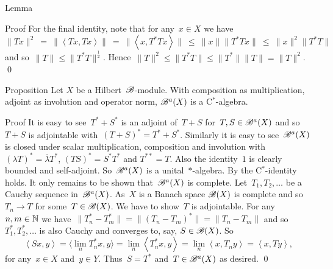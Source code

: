 \begin{parsec}
\begin{point}{Lemma}
\begin{point}{Proof}
For the final identity, note that for any~$x \in X$ we have
\begin{equation*}
\|Tx\|^2 \ =\  \|\left<Tx,Tx\right>\| 
            \ =\  \| \left<x, T^*Tx\right>\|
            \ \leq\  \|x \| \|T^*Tx \|
            \ \leq\  \|x\|^2 \|T^*T\|
\end{equation*}
and so~$\|T\| \leq \|T^*T\|^{\frac{1}{2}}$.
Hence~$\|T\|^2 \leq \|T^*T\| \leq \|T^*\|\|T\| = \|T\|^2$.
    \qed
\end{point}
\end{point}
\begin{point}{Proposition}%
Let $X$ be a Hilbert~$\mathscr{B}$-module.
With composition as multiplication,
    adjoint as involution
    and operator norm,
     $\mathscr{B}^a(X)$ is a C$^*$-algebra.
\begin{point}{Proof}
It is easy to see~$T^*+S^*$ is an adjoint of~$T+S$
    for~$T,S \in \mathscr{B}^a(X)$
    and so~$T+S$ is adjointable with~$(T+S)^* = T^*+ S^*$.
    Similarly it is easy to see~$\mathscr{B}^a(X)$
        is closed under scalar multiplication, composition and involution
        with~$(\lambda T)^* = \overline{\lambda} T^* $,
            $(TS)^* = S^*T^*$ and
            $T^{**} =T$.
Also the identity~$1$ is clearly bounded and self-adjoint.
So~$\mathscr{B}^a(X)$ is a unital~$*$-algebra.
By  
    the C$^*$-identity holds.
It only remains to be shown that~$\mathscr{B}^a(X)$ is complete.
Let~$T_1,T_2,\ldots$ be a Cauchy sequence in~$\mathscr{B}^a(X)$.
As~$X$ is a Banach space $\mathscr{B}(X)$ is complete
    and so~$T_n \to T$ for some~$T \in \mathscr{B}(X)$.
We have to show~$T$ is adjointable.
For any~$n,m \in \mathbb{N}$ we have~$\|T_n^* - T_m^*\|
= \|(T_n - T_m)^*\| = \|T_n - T_m\|$
and so~$T^*_1, T^*_2,\ldots$
is also Cauchy
and converges to, say, $S \in \mathscr{B}(X)$.
So
\begin{equation*}
\left<S x, y\right> =
\langle\lim_{n} T^*_n x, y\rangle = \lim_n \left<T_n^* x, y\right>
                = \lim_n \left<x, T_n y\right>
                =  \left<x, T y\right>,
\end{equation*}
for any~$x \in X$ and~$y \in Y$.
Thus~$S = T^*$ and~$T \in \mathscr{B}^a(X)$ as desired. \qed
\end{point}
\end{point}
\end{parsec}
